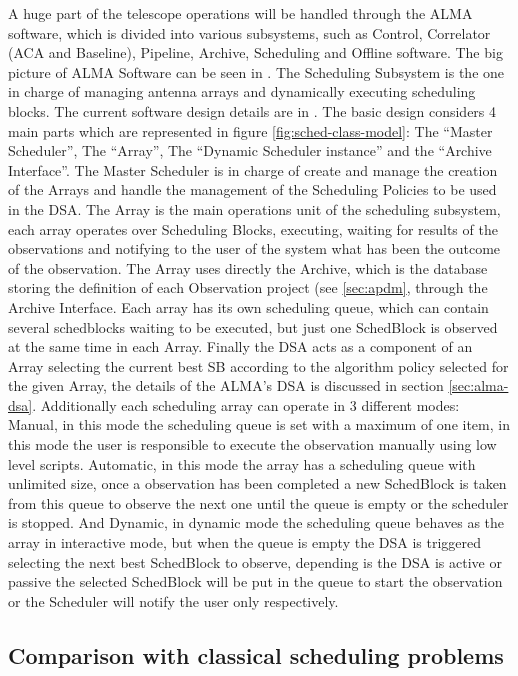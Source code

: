 \documentclass[11pt]{article}
\begin{document}
A huge part of the telescope operations will be handled through the ALMA software, which is divided into various subsystems, such as Control, Correlator (ACA and Baseline), Pipeline, Archive, Scheduling and Offline software. The big picture of ALMA Software can be seen in \cite{schwarz04}.
The Scheduling Subsystem is the one in charge of managing antenna arrays and dynamically executing scheduling blocks. The current software design details are in \cite{clarke12}. The basic design considers 4 main parts which are represented in figure \ref{fig:sched-class-model}: The ``Master Scheduler'', The ``Array'', The ``Dynamic Scheduler instance'' and the ``Archive Interface''. The Master Scheduler is in charge of create and manage the creation of the Arrays and handle the management of the Scheduling Policies to be used in the DSA. The Array is the main operations unit of the scheduling subsystem, each array operates over Scheduling Blocks, executing, waiting for results of the observations and notifying to the user of the system what has been the outcome of the observation. The Array uses directly the Archive, which is the database storing the definition of each Observation project (see \ref{sec:apdm}, through the Archive Interface. Each array has its own scheduling queue, which can contain several schedblocks waiting to be executed, but just one SchedBlock is observed at the same time in each Array. Finally the DSA acts as a component of an Array selecting the current best SB according to the algorithm policy selected for the given Array, the details of the ALMA's DSA is discussed in section \ref{sec:alma-dsa}. Additionally each scheduling array can operate in 3 different modes: Manual, in this mode the scheduling queue is set with a maximum of one item, in this mode the user is responsible to execute the observation manually using low level scripts. Automatic, in this mode the array has a scheduling queue with unlimited size, once a observation has been completed a new SchedBlock is taken from this queue to observe the next one until the queue is empty or the scheduler is stopped. And Dynamic, in dynamic mode the scheduling queue behaves as the array in interactive mode, but when the queue is empty the DSA is triggered selecting the next best SchedBlock to observe, depending is the DSA is active or passive the selected SchedBlock will be put in the queue to start the observation or the Scheduler will notify the user only respectively.


\subsection*{Comparison with classical scheduling problems}
\end{document}
